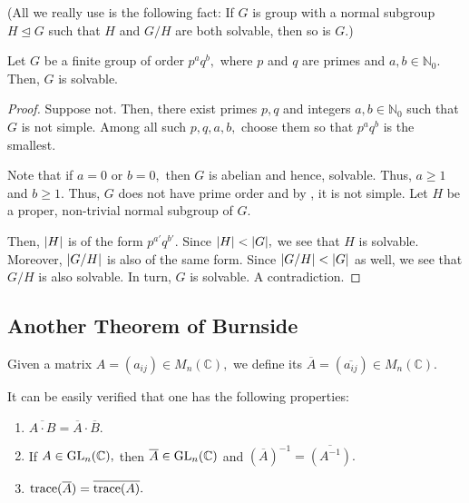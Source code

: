 (All we really use is the following fact: If $G$ is group with a normal subgroup $H \unlhd G$ such that $H$ and $G/H$ are both solvable, then so is $G.$)

\begin{cor}[Burnside]
	Let $G$ be a finite group of order $p^aq^b,$ where $p$ and $q$ are primes and $a, b \in \mathbb{N}_0.$ Then, $G$ is solvable.
\end{cor}
\begin{proof} 
	Suppose not. Then, there exist primes $p, q$ and integers $a, b \in \mathbb{N}_0$ such that $G$ is not simple. Among all such $p, q, a, b,$ choose them so that $p^aq^b$ is the smallest.

	Note that if $a = 0$ or $b = 0,$ then $G$ is abelian and hence, solvable. Thus, $a \ge 1$ and $b \ge 1.$ Thus, $G$ does not have prime order and by , it is not simple. Let $H$ be a proper, non-trivial normal subgroup of $G.$

	Then, ${\left\lvert H \right\lvert}$ is of the form $p^{a'}q^{b'}.$ Since ${\left\lvert H \right\lvert} < {\left\lvert G \right\lvert},$ we see that $H$ is solvable. Moreover, ${\left\lvert G/H \right\lvert}$ is also of the same form. Since ${\left\lvert G/H \right\lvert} < {\left\lvert G \right\lvert}$ as well, we see that $G/H$ is also solvable. In turn, $G$ is solvable. A contradiction.  
\end{proof}

\subsection{Another Theorem of Burnside}

\begin{defn}%
	Given a matrix $A = (a_{ij}) \in M_n(\mathbb{C}),$ we define its  $\overline{A} = (\overline{a_{ij}}) \in M_n(\mathbb{C}).$
\end{defn}

\begin{rem}
	It can be easily verified that one has the following properties:
	\begin{enumerate}
		\item $\overline{A \cdot B} = \overline{A} \cdot \overline{B}.$
		\item If $A \in \operatorname{GL}_n(\mathbb{C}),$ then $\overline{A} \in \operatorname{GL}_n(\mathbb{C})$ and $\left(\overline{A}\right)^{-1} = \overline{\left(A^{-1}\right)}.$
		\item $\operatorname{trace}(\overline{A}) = \overline{\operatorname{trace}(A)}.$
	\end{enumerate}
\end{rem}

